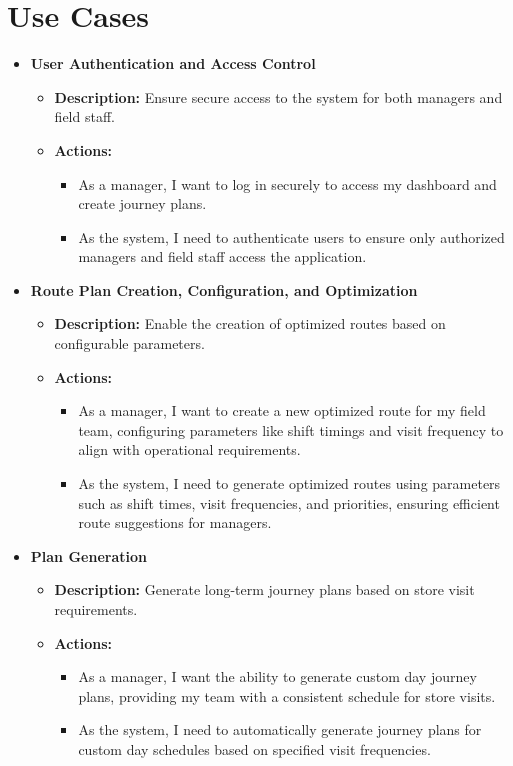 \section{Use Cases}
\begin{itemize}
    \item \textbf{User Authentication and Access Control}
    \begin{itemize}
        \item \textbf{Description:} Ensure secure access to the system for both managers and field staff.
        \item \textbf{Actions:}
        \begin{itemize}
            \item As a manager, I want to log in securely to access my dashboard and create journey plans.
            \item As the system, I need to authenticate users to ensure only authorized managers and field staff access the application.
        \end{itemize}
    \end{itemize}
    
    \item \textbf{Route Plan Creation, Configuration, and Optimization}
    \begin{itemize}
        \item \textbf{Description:} Enable the creation of optimized routes based on configurable parameters.
        \item \textbf{Actions:}
        \begin{itemize}
            \item As a manager, I want to create a new optimized route for my field team, configuring parameters like shift timings and visit frequency to align with operational requirements.
            \item As the system, I need to generate optimized routes using parameters such as shift times, visit frequencies, and priorities, ensuring efficient route suggestions for managers.
        \end{itemize}
    \end{itemize}

    \item \textbf{Plan Generation}
    \begin{itemize}
        \item \textbf{Description:} Generate long-term journey plans based on store visit requirements.
        \item \textbf{Actions:}
        \begin{itemize}
            \item As a manager, I want the ability to generate custom day journey plans, providing my team with a consistent schedule for store visits.
            \item As the system, I need to automatically generate journey plans for custom day schedules based on specified visit frequencies.
        \end{itemize}
    \end{itemize}
    

\end{itemize}
